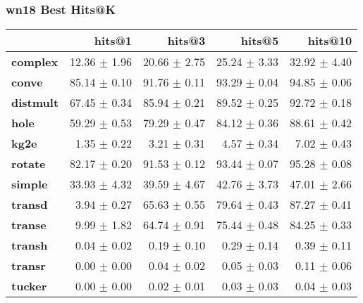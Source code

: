 \documentclass{article}
\begin{document}
\subsubsection{wn18 Best Hits@K}
    \begin{center}
    \begin{tabular}{lrrrr}
\toprule
{} &        hits@1 &        hits@3 &        hits@5 &       hits@10 \\
\midrule
\textbf{complex } &  12.36 $\pm$ 1.96 &  20.66 $\pm$ 2.75 &  25.24 $\pm$ 3.33 &  32.92 $\pm$ 4.40 \\
\textbf{conve   } &  85.14 $\pm$ 0.10 &  91.76 $\pm$ 0.11 &  93.29 $\pm$ 0.04 &  94.85 $\pm$ 0.06 \\
\textbf{distmult} &  67.45 $\pm$ 0.34 &  85.94 $\pm$ 0.21 &  89.52 $\pm$ 0.25 &  92.72 $\pm$ 0.18 \\
\textbf{hole    } &  59.29 $\pm$ 0.53 &  79.29 $\pm$ 0.47 &  84.12 $\pm$ 0.36 &  88.61 $\pm$ 0.42 \\
\textbf{kg2e    } &   1.35 $\pm$ 0.22 &   3.21 $\pm$ 0.31 &   4.57 $\pm$ 0.34 &   7.02 $\pm$ 0.43 \\
\textbf{rotate  } &  82.17 $\pm$ 0.20 &  91.53 $\pm$ 0.12 &  93.44 $\pm$ 0.07 &  95.28 $\pm$ 0.08 \\
\textbf{simple  } &  33.93 $\pm$ 4.32 &  39.59 $\pm$ 4.67 &  42.76 $\pm$ 3.73 &  47.01 $\pm$ 2.66 \\
\textbf{transd  } &   3.94 $\pm$ 0.27 &  65.63 $\pm$ 0.55 &  79.64 $\pm$ 0.43 &  87.27 $\pm$ 0.41 \\
\textbf{transe  } &   9.99 $\pm$ 1.82 &  64.74 $\pm$ 0.91 &  75.44 $\pm$ 0.48 &  84.25 $\pm$ 0.33 \\
\textbf{transh  } &   0.04 $\pm$ 0.02 &   0.19 $\pm$ 0.10 &   0.29 $\pm$ 0.14 &   0.39 $\pm$ 0.11 \\
\textbf{transr  } &   0.00 $\pm$ 0.00 &   0.04 $\pm$ 0.02 &   0.05 $\pm$ 0.03 &   0.11 $\pm$ 0.06 \\
\textbf{tucker  } &   0.00 $\pm$ 0.00 &   0.02 $\pm$ 0.01 &   0.03 $\pm$ 0.03 &   0.04 $\pm$ 0.03 \\
\bottomrule
\end{tabular}

    \end{center}
\end{document}
